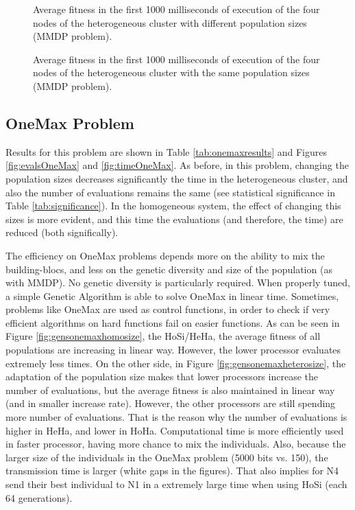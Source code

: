 \documentclass{sig-alternate}
\begin{document}
\begin{figure}
\centering
{}
\caption{Average fitness in the first 1000 milliseconds of execution of the four nodes of the heterogeneous cluster with different population sizes (MMDP problem).}
\label{fig:hesiheha}
\end{figure}

\begin{figure}
\centering
{}
\caption{Average fitness in the first 1000 milliseconds of execution of the four nodes of the heterogeneous cluster with the same population sizes (MMDP problem).}
\label{fig:hosiheha}
\end{figure}

\subsection{OneMax Problem}

Results for this problem are shown in Table \ref{tab:onemaxresults} and Figures \ref{fig:evalsOneMax} and \ref{fig:timeOneMax}. As before, in this problem, changing the population sizes decreases significantly the time  in the heterogeneous cluster, and also the number of evaluations remains the same (see statistical significance in Table \ref{tab:significance}). In the homogeneous system, the effect of changing this sizes is more evident, and this time the evaluations (and therefore, the time) are reduced (both significally). 

The efficiency on OneMax problems depends more on the ability to mix the building-blocs, and less on the genetic diversity and size of the population (as with MMDP). No genetic diversity is particularly required. When properly tuned, a simple Genetic Algorithm is able to solve OneMax in linear time. Sometimes, problems like OneMax are used as control functions, in order to check if very efficient algorithms on hard functions fail on easier functions. As can be seen in Figure \ref{fig:gensonemaxhomosize}, the HoSi/HeHa, the average fitness of all populations are increasing in linear way. However, the lower processor evaluates extremely less times.  On the other side, in Figure \ref{fig:gensonemaxheterosize}, the adaptation of the population size makes that lower processors increase the number of evaluations, but the average fitness is also maintained in linear way (and in smaller increase rate). However, the other processors are still spending more number of evaluations. That is the reason why the number of evaluations is higher in HeHa, and lower in HoHa. Computational time is more efficiently used in faster processor, having more chance to mix the individuals. Also, because the larger size of the individuals in the OneMax problem (5000 bits vs. 150), the transmission time is larger (white gaps in the figures). That also implies for N4 send their best individual to N1 in a extremely large time when using HoSi (each 64 generations).
\end{document}
